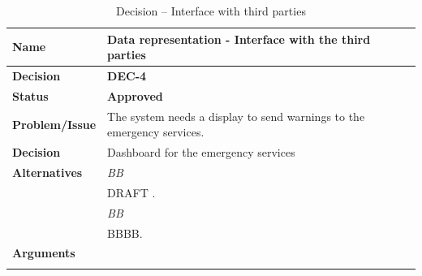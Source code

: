 \begin{table}[h]
\begin{tabular}{L{0.2\textwidth} L{0.6\textwidth}}
    \textbf{Name} 			& \textbf{Data representation - Interface with the third parties} \\ \toprule
    \textbf{Decision} 		& \textbf{DEC-4}\\ \midrule
    \textbf{Status} 		& \textbf{Approved} \\ \midrule
    \textbf{Problem/Issue} 	& The system needs a display to send warnings to the emergency services. \\ \midrule
    \textbf{Decision} 		& Dashboard for the emergency services\\ \midrule
    \textbf{Alternatives} 	& \textit{BB}\\
    						& DRAFT .\\
    						& \textit{BB}\\
    						& BBBB.\\
    						\midrule
    \textbf{Arguments} 		& \\

    \\ \bottomrule
\end{tabular}
\caption{Decision -- Interface with third parties}
\label{table:linux}
\end{table}

